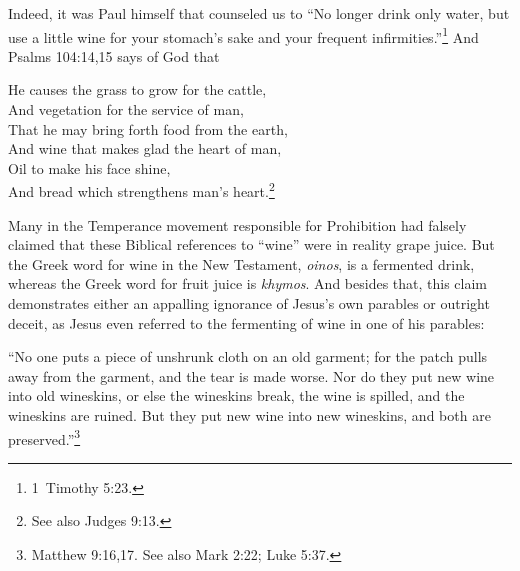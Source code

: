 \documentclass[letterpaper,12pt]{article}
\newenvironment{squote}
  {\small\quote}
  {\endquote\normalsize}
\newenvironment{sverse}
  {\small\verse}
  {\endverse\normalsize}
\begin{document}
Indeed, it was Paul himself that counseled us to ``No longer drink only water, but use a little wine for your stomach's sake and your frequent infirmities.''\footnote{1~Timothy 5:23.} And Psalms 104:14,15 says of God that

\begin{sverse}
He causes the grass to grow for the cattle,\\
And vegetation for the service of man,\\
That he may bring forth food from the earth,\\
And wine that makes glad the heart of man,\\
Oil to make his face shine,\\
And bread which strengthens man's heart.\footnote{See also Judges 9:13.}
\end{sverse}

Many in the Temperance movement responsible for Prohibition had falsely claimed that these Biblical references to ``wine'' were in reality grape juice. But the Greek word for wine in the New Testament, \emph{oinos}, is a fermented drink, whereas the Greek word for fruit juice is \emph{khymos}. And besides that, this claim demonstrates either an appalling ignorance of Jesus's own parables or outright deceit, as Jesus even referred to the fermenting of wine in one of his parables:

\begin{squote}
``No one puts a piece of unshrunk cloth on an old garment; for the patch pulls away from the garment, and the tear is made worse. Nor do they put new wine into old wineskins, or else the wineskins break, the wine is spilled, and the wineskins are ruined. But they put new wine into new wineskins, and both are preserved.''\footnote{Matthew 9:16,17. See also Mark 2:22; Luke 5:37.}
\end{squote}
\end{document}
